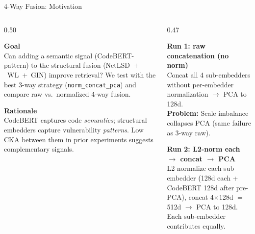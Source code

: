 \documentclass[aspectratio=169,10pt]{beamer}
\begin{document}
\begin{frame}{4-Way Fusion: Motivation}
\begin{columns}[T]
\begin{column}{0.50\textwidth}

  \textbf{Goal}\\[3pt]
  {\small Can adding a semantic signal (CodeBERT-pattern) to the structural
  fusion (NetLSD~$+$~WL~$+$~GIN) improve retrieval?
  We test with the best 3-way strategy (\texttt{norm\_concat\_pca})
  and compare raw vs.\ normalized 4-way fusion.}

  \vspace{0.6em}
  \textbf{Rationale}\\[3pt]
  {\small CodeBERT captures code \textit{semantics}; structural embedders
  capture vulnerability \textit{patterns}. Low CKA between them
  in prior experiments suggests complementary signals.}

\end{column}
\begin{column}{0.47\textwidth}

  \textbf{Run 1: raw concatenation (no norm)}\\[2pt]
  {\scriptsize Concat all 4 sub-embedders without per-embedder
  normalization $\to$ PCA to 128d.\\
  \textbf{Problem:} Scale imbalance collapses PCA (same failure as 3-way raw).}

  \vspace{0.5em}
  \textbf{Run 2: L2-norm each $\to$ concat $\to$ PCA}\\[2pt]
  {\scriptsize L2-normalize each sub-embedder (128d each + CodeBERT 128d after
  pre-PCA), concat 4$\times$128d $=$ 512d $\to$ PCA to 128d.\\
  Each sub-embedder contributes equally.}

\end{column}
\end{columns}
\end{frame}
\end{document}
